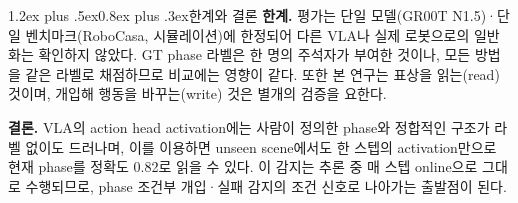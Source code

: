 \documentclass[a4paper,twocolumn,9pt]{extarticle}
\makeatletter
\renewcommand\section{\@startsection{section}{1}{\z@}%
  {1.2ex plus .5ex}{0.8ex plus .3ex}{\normalsize\bfseries}}
\makeatother
\begin{document}


\section{한계와 결론}
\textbf{한계.} 평가는 단일 모델(GR00T N1.5)·단일 벤치마크(RoboCasa, 시뮬레이션)에 한정되어 다른 VLA나 실제 로봇으로의 일반화는 확인하지 않았다. GT phase 라벨은 한 명의 주석자가 부여한 것이나, 모든 방법을 같은 라벨로 채점하므로 비교에는 영향이 같다. 또한 본 연구는 표상을 읽는(read) 것이며, 개입해 행동을 바꾸는(write) 것은 별개의 검증을 요한다.

\textbf{결론.} VLA의 action head activation에는 사람이 정의한 phase와 정합적인 구조가 라벨 없이도 드러나며, 이를 이용하면 unseen scene에서도 한 스텝의 activation만으로 현재 phase를 정확도 0.82로 읽을 수 있다. 이 감지는 추론 중 매 스텝 online으로 그대로 수행되므로, phase 조건부 개입·실패 감지의 조건 신호로 나아가는 출발점이 된다.

\end{document}
